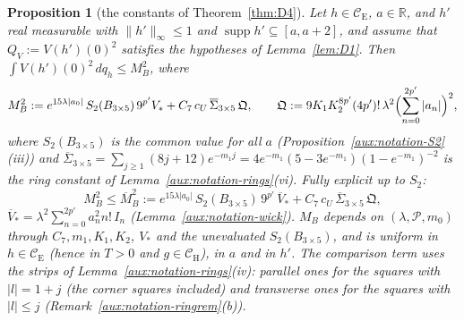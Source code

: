 \documentclass[11pt,a4paper]{article}
\theoremstyle{plain}
\theoremstyle{definition}
\theoremstyle{plain}
\newtheorem{auxprop}[auxlemma]{Proposition}
\theoremstyle{definition}
\newcommand{\R}{\mathbb{R}}
\newcommand{\CE}{\mathcal{C}_{\mathrm E}}
\newcommand{\CH}{\mathcal{C}_{\mathrm H}}
\DeclareMathOperator{\supp}{supp}
\begin{document}
\begin{auxprop}[the constants of Theorem~\ref{thm:D4}]\label{aux:constants-D4}
Let $h\in\CE$, $a\in\R$, and $h'$ real measurable with $\|h'\|_\infty\le1$ and $\supp
h'\subseteq[a,a+2]$, and assume that $Q_V:=V(h')(0)^2$ satisfies the hypotheses of
Lemma~\ref{lem:D1}.  Then $\int V(h')(0)^2\,dq_h\le M_B^2$, where
\[
 M_B^2:=e^{15\lambda|a_0|}\,S_2(B_{3\times5})\,9^{p'}V_*
 +C_7\,c_U\,\overline\Sigma_{3\times5}\,\mathfrak Q,
 \qquad
 \mathfrak Q:=9K_1K_2^{8p'}(4p')!\,\lambda^2\Bigl(\sum_{n=0}^{2p'}|a_n|\Bigr)^2 ,
\]
where $S_2(B_{3\times5})$ is the common value for all $a$ (Proposition~\ref{aux:notation-S2}(iii))
and $\overline\Sigma_{3\times5}=\sum_{j\ge1}(8j+12)e^{-m_1j}=4e^{-m_1}(5-3e^{-m_1})
(1-e^{-m_1})^{-2}$ is the ring constant of Lemma~\ref{aux:notation-rings}(vi).  Fully explicit up
to $S_2$:
\[
 M_B^2\le\overline M_B^2:=e^{15\lambda|a_0|}\,S_2(B_{3\times5})\,9^{p'}\,\overline V_*
 +C_7\,c_U\,\overline\Sigma_{3\times5}\,\mathfrak Q ,
\]
$\overline V_*=\lambda^2\sum_{n=0}^{2p'}a_n^2n!\,I_n$ (Lemma~\ref{aux:notation-wick}).  $M_B$
depends on $(\lambda,\mathscr P,m_0)$ through $C_7,m_1,K_1,K_2$, $V_*$ and the unevaluated
$S_2(B_{3\times5})$, and is uniform in $h\in\CE$ (hence in $T>0$ and $g\in\CH$), in $a$ and in
$h'$.  The comparison term uses the strips of Lemma~\ref{aux:notation-rings}(iv): parallel ones
for the squares with $|l|=1+j$ (the corner squares included) and transverse ones for the squares
with $|l|\le j$ (Remark~\ref{aux:notation-ringrem}(b)).
\end{auxprop}
\end{document}

